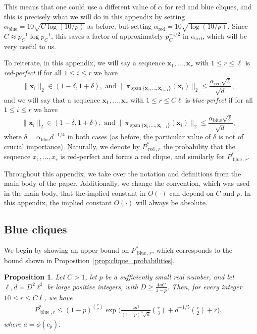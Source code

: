 \documentclass[11pt]{amsart}
\newtheorem{proposition}[theorem]{\bf Proposition}
\theoremstyle{definition}
\def\bx{\boldsymbol{x}}
\DeclareMathOperator{\red}{red}
\DeclareMathOperator{\blue}{blue}
\DeclareMathOperator{\spn}{span}
\begin{document}
This means that one could use a different value of $\alpha$ for red and blue cliques, and this is precisely what we will do in this appendix by setting $\alpha_{\blue} = 10\sqrt{C\log (10/p)}$ as before, but setting $\alpha_{\red} = 10\sqrt{\log (10/p)}$. Since $C\approx p_C^{-1}\log p_C^{-1}$, this saves a factor of approximately $p_C^{-1/2}$ in $\alpha_{\red}$, which will be very useful to us.

To reiterate, in this appendix, we will say a sequence $\bx_1, \dots, \bx_r$ with $1\leq r\leq \ell$ is \textit{red-perfect} if for all $1\leq i \leq r$ we have 
{\smaller[0.3]
\[\|\bx_i\|_2\in (1-\delta, 1+\delta),\text{ and } \|\pi_{\spn\{\bx_1, \dots, \bx_{i-1}\}}(\bx_i)\|_2 \leq \frac{\alpha_{\red}\sqrt{\ell}}{\sqrt{d}},\]
}
and we will say that a sequence $\bx_1, \dots, \bx_r$ with $1\leq r\leq C\ell$ is \textit{blue-perfect} if for all $1\leq i \leq r$ we have
{\smaller[0.3]
\[\|\bx_i\|_2\in (1-\delta, 1+\delta),\text{ and } \|\pi_{\spn\{\bx_1, \dots, \bx_{i-1}\}}(\bx_i)\|_2 \leq \frac{\alpha_{\blue}\sqrt{\ell}}{\sqrt{d}},\]
}
where $\delta=\alpha_{\blue} d^{-1/4}$ in both cases (as before, the particular value of $\delta$ is not of crucial importance). Naturally, we denote by $P_{\red, r}^*$ the probability that the sequence $x_1, \dots, x_r$ is red-perfect and forms a red clique, and similarly for $P_{\blue, r}^*$.

Throughout this appendix, we take over the notation and definitions from the main body of the paper. Additionally, we change the convention, which was used in the main body, that the implied constant in $O(\cdot)$ can depend on $C$ and $p$. In this appendix, the implied constant $O(\cdot)$ will always be absolute.

\subsection{Blue cliques} We begin by showing an upper bound on $P_{\blue, r}^*$, which corresponds to the bound shown in Proposition~\ref{prop:clique_probabilities}.

\begin{proposition}\label{prop:perfect_probabilities_appendix_blue}
Let $C>1$, let $p$ be a sufficiently small real number, and let $\ell, d=D^2\ell^2$ be large positive integers, with $D\geq \frac{4aC}{1-p}$. Then, for every integer $10\leq r\leq C\ell$, we have
{\smaller[0.3]
\begin{align}
P_{\blue, r}^*\leq (1-p)^{\binom{r}{2}}\exp\bigg(\frac{4a^3}{(1-p)^3\sqrt d}\binom{r}{3} + d^{-1/5}\binom{r}{2}+ r\bigg),\label{eq:perfect_probabilities_appendix_blue}
\end{align}
}
where $a=\phi(c_p)$.
\end{proposition}
\end{document}
